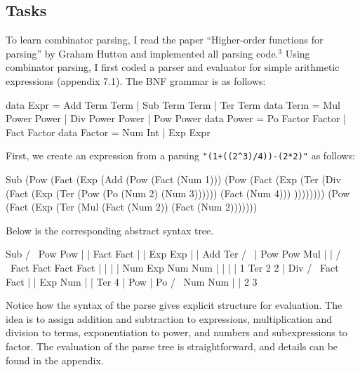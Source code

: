 \documentclass[11pt]{article}
\begin{document}
\subsection{Tasks}

To learn combinator parsing, I read the paper ``Higher-order functions for parsing'' by Graham Hutton and implemented all parsing code.$^3$ Using combinator parsing, I first coded a parser and evaluator for simple arithmetic expressions (appendix 7.1). The BNF grammar is as follows:

\hspace{2cm}\begin{verbbox}
data Expr = Add Term Term | Sub Term Term | Ter Term   
data Term = Mul Power Power | Div Power Power | Pow Power 
data Power = Po Factor Factor | Fact Factor 
data Factor = Num Int | Exp Expr
\end{verbbox}
\theverbbox

First, we create an expression from a parsing \verb|"(1+((2^3)/4))-(2*2)"| as follows:

\hspace{2cm}\begin{verbbox}
Sub (Pow (Fact (Exp (Add (Pow (Fact (Num 1))) (Pow (Fact (Exp (Ter 
(Div (Fact (Exp (Ter (Pow (Po (Num 2) (Num 3)))))) (Fact (Num 4)))
)))))))) (Pow (Fact (Exp (Ter (Mul (Fact (Num 2)) (Fact (Num 2))))))) 
\end{verbbox}
\theverbbox

Below is the corresponding abstract syntax tree.


\hspace{5cm}\begin{verbbox}
         Sub 
       /     \
    Pow       Pow
     |         |
    Fact      Fact
     |         |
    Exp       Exp
     |         |
    Add       Ter
   /   \       |
 Pow   Pow    Mul
  |     |     / \
 Fact  Fact Fact Fact
  |     |    |    |
 Num   Exp  Num  Num
  |     |    |    |
  1    Ter   2    2
        |
       Div
      /   \
    Fact Fact
     |    |
    Exp  Num
     |    |
    Ter   4
     |
    Pow
     |
     Po
    /  \ 
  Num  Num
  |     |
  2     3
\end{verbbox}
\theverbbox

Notice how the syntax of the parse gives explicit structure for evaluation. The idea is to assign addition and subtraction to expressions, multiplication and division to terms, exponentiation to power, and numbers and subexpressions to factor. The evaluation of the parse tree is straightforward, and details can be found in the appendix.
\end{document}
